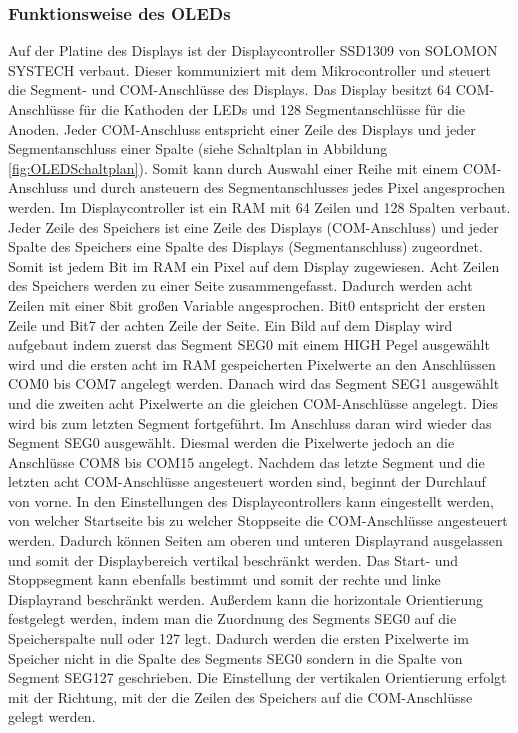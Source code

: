 \subsubsection{Funktionsweise des \acl{OLED}s}\label{sec:FunktionOLED}
Auf der Platine des Displays ist der Displaycontroller SSD1309 von SOLOMON SYSTECH verbaut. Dieser kommuniziert mit dem Mikrocontroller und steuert die Segment- und COM-Anschlüsse des Displays. Das Display besitzt 64 COM-Anschlüsse für die Kathoden der LEDs und 128 Segmentanschlüsse für die Anoden. Jeder COM-Anschluss entspricht einer Zeile des Displays und jeder Segmentanschluss einer Spalte (siehe Schaltplan in Abbildung \ref{fig:OLEDSchaltplan}). Somit kann durch Auswahl einer Reihe mit einem COM-Anschluss und durch ansteuern des Segmentanschlusses jedes Pixel angesprochen werden. Im Displaycontroller ist ein \ac{RAM} mit 64 Zeilen und 128 Spalten verbaut. Jeder Zeile des Speichers ist eine Zeile des Displays (COM-Anschluss) und jeder Spalte des Speichers eine Spalte des Displays (Segmentanschluss) zugeordnet. Somit ist jedem Bit im \ac{RAM} ein Pixel auf dem Display zugewiesen. Acht Zeilen des Speichers werden zu einer Seite zusammengefasst. Dadurch werden acht Zeilen mit einer 8bit großen Variable angesprochen. Bit0 entspricht der ersten Zeile und Bit7 der achten Zeile der Seite. Ein Bild auf dem Display wird aufgebaut indem zuerst das Segment SEG0 mit einem HIGH Pegel ausgewählt wird und die ersten acht im \ac{RAM} gespeicherten Pixelwerte an den Anschlüssen COM0 bis COM7 angelegt werden. Danach wird das Segment SEG1 ausgewählt und die zweiten acht Pixelwerte an die gleichen COM-Anschlüsse angelegt. Dies wird bis zum letzten Segment fortgeführt. Im Anschluss daran wird wieder das Segment SEG0 ausgewählt. Diesmal werden die Pixelwerte jedoch an die Anschlüsse COM8 bis COM15 angelegt. Nachdem das letzte Segment und die letzten acht COM-Anschlüsse angesteuert worden sind, beginnt der Durchlauf von vorne. In den Einstellungen des Displaycontrollers kann eingestellt werden, von welcher Startseite bis zu welcher Stoppseite die COM-Anschlüsse angesteuert werden. Dadurch können Seiten am oberen und unteren Displayrand ausgelassen und somit der Displaybereich vertikal beschränkt werden. Das Start- und Stoppsegment kann ebenfalls bestimmt und somit der rechte und linke Displayrand beschränkt werden. Außerdem kann die horizontale Orientierung festgelegt werden, indem man die Zuordnung des Segments SEG0 auf die Speicherspalte null oder 127 legt. Dadurch werden die ersten Pixelwerte im Speicher nicht in die Spalte des Segments SEG0 sondern in die Spalte von Segment SEG127 geschrieben. Die Einstellung der vertikalen Orientierung erfolgt mit der Richtung, mit der die Zeilen des Speichers auf die COM-Anschlüsse gelegt werden.

